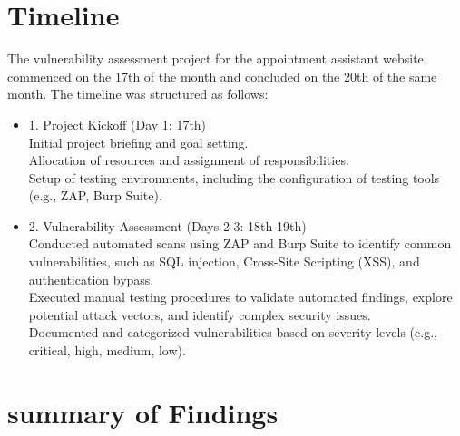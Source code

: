 \documentclass[openany]{report}
\begin{document}
\section{Timeline}
The vulnerability assessment project for the appointment assistant website commenced on the 17th of the month and concluded on the 20th of the same month. The timeline was structured as follows:
\begin{itemize}
    \item 1. Project Kickoff (Day 1: 17th)\\
          Initial project briefing and goal setting.\\
          Allocation of resources and assignment of responsibilities.\\
          Setup of testing environments, including the configuration of testing tools (e.g., ZAP, Burp Suite).
    \item 2. Vulnerability Assessment (Days 2-3: 18th-19th)\\
          Conducted automated scans using ZAP and Burp Suite to identify common vulnerabilities, such as SQL injection, Cross-Site Scripting (XSS), and authentication bypass.\\
          Executed manual testing procedures to validate automated findings, explore potential attack vectors, and identify complex security issues.\\
          Documented and categorized vulnerabilities based on severity levels (e.g., critical, high, medium, low).
\end{itemize}
\section{summary of Findings}
\end{document}
